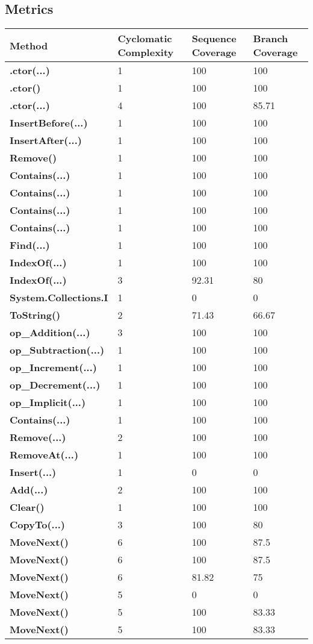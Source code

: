 \documentclass[a4paper,10pt]{article}
\begin{document}
\subsection{Metrics}
\begin{longtable}[l]{|l|l|l|l|}
\hline
\textbf{Method} & \textbf{Cyclomatic Complexity} & \textbf{Sequence Coverage} & \textbf{Branch Coverage}\\
\hline
\textbf{.ctor(...)} & 1 & 100 & 100\\
\hline
\textbf{.ctor()} & 1 & 100 & 100\\
\hline
\textbf{.ctor(...)} & 4 & 100 & 85.71\\
\hline
\textbf{InsertBefore(...)} & 1 & 100 & 100\\
\hline
\textbf{InsertAfter(...)} & 1 & 100 & 100\\
\hline
\textbf{Remove()} & 1 & 100 & 100\\
\hline
\textbf{Contains(...)} & 1 & 100 & 100\\
\hline
\textbf{Contains(...)} & 1 & 100 & 100\\
\hline
\textbf{Contains(...)} & 1 & 100 & 100\\
\hline
\textbf{Contains(...)} & 1 & 100 & 100\\
\hline
\textbf{Find(...)} & 1 & 100 & 100\\
\hline
\textbf{IndexOf(...)} & 1 & 100 & 100\\
\hline
\textbf{IndexOf(...)} & 3 & 92.31 & 80\\
\hline
\textbf{System.Collections.I} & 1 & 0 & 0\\
\hline
\textbf{ToString()} & 2 & 71.43 & 66.67\\
\hline
\textbf{op\_Addition(...)} & 3 & 100 & 100\\
\hline
\textbf{op\_Subtraction(...)} & 1 & 100 & 100\\
\hline
\textbf{op\_Increment(...)} & 1 & 100 & 100\\
\hline
\textbf{op\_Decrement(...)} & 1 & 100 & 100\\
\hline
\textbf{op\_Implicit(...)} & 1 & 100 & 100\\
\hline
\textbf{Contains(...)} & 1 & 100 & 100\\
\hline
\textbf{Remove(...)} & 2 & 100 & 100\\
\hline
\textbf{RemoveAt(...)} & 1 & 100 & 100\\
\hline
\textbf{Insert(...)} & 1 & 0 & 0\\
\hline
\textbf{Add(...)} & 2 & 100 & 100\\
\hline
\textbf{Clear()} & 1 & 100 & 100\\
\hline
\textbf{CopyTo(...)} & 3 & 100 & 80\\
\hline
\textbf{MoveNext()} & 6 & 100 & 87.5\\
\hline
\textbf{MoveNext()} & 6 & 100 & 87.5\\
\hline
\textbf{MoveNext()} & 6 & 81.82 & 75\\
\hline
\textbf{MoveNext()} & 5 & 0 & 0\\
\hline
\textbf{MoveNext()} & 5 & 100 & 83.33\\
\hline
\textbf{MoveNext()} & 5 & 100 & 83.33\\
\hline
\end{longtable}
\end{document}
